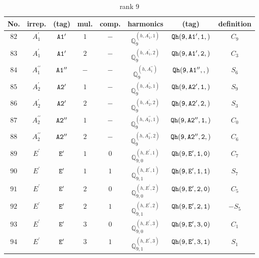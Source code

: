 \documentclass[fleqn,8pt]{jsarticle}
\begin{document}
\begin{table}[ht!]
\begin{center}
\caption{rank 9}
\renewcommand{\arraystretch}{1.3}
\begin{tabular}{cccccccc} \hline \hline
No. & irrep. & (tag) & mul. & comp. & harmonics & (tag) & definition \\ \hline
$ 82 $ & $ A_{1}^{\prime} $ & $ {\tt A1'} $ & $ 1 $ & $ - $ & $ \mathbb{Q}_{9}^{(h,A_{1}^{\prime},1)} $ & $ {\tt Qh(9,A1',1,)} $ & $ C_{9} $ \\
$ 83 $ & $ A_{1}^{\prime} $ & $ {\tt A1'} $ & $ 2 $ & $ - $ & $ \mathbb{Q}_{9}^{(h,A_{1}^{\prime},2)} $ & $ {\tt Qh(9,A1',2,)} $ & $ C_{3} $ \\
$ 84 $ & $ A_{1}^{\prime\prime} $ & $ {\tt A1''} $ & $ - $ & $ - $ & $ \mathbb{Q}_{9}^{(h,A_{1}^{\prime\prime})} $ & $ {\tt Qh(9,A1'',,)} $ & $ S_{6} $ \\
$ 85 $ & $ A_{2}^{\prime} $ & $ {\tt A2'} $ & $ 1 $ & $ - $ & $ \mathbb{Q}_{9}^{(h,A_{2}^{\prime},1)} $ & $ {\tt Qh(9,A2',1,)} $ & $ S_{9} $ \\
$ 86 $ & $ A_{2}^{\prime} $ & $ {\tt A2'} $ & $ 2 $ & $ - $ & $ \mathbb{Q}_{9}^{(h,A_{2}^{\prime},2)} $ & $ {\tt Qh(9,A2',2,)} $ & $ S_{3} $ \\
$ 87 $ & $ A_{2}^{\prime\prime} $ & $ {\tt A2''} $ & $ 1 $ & $ - $ & $ \mathbb{Q}_{9}^{(h,A_{2}^{\prime\prime},1)} $ & $ {\tt Qh(9,A2'',1,)} $ & $ C_{0} $ \\
$ 88 $ & $ A_{2}^{\prime\prime} $ & $ {\tt A2''} $ & $ 2 $ & $ - $ & $ \mathbb{Q}_{9}^{(h,A_{2}^{\prime\prime},2)} $ & $ {\tt Qh(9,A2'',2,)} $ & $ C_{6} $ \\
$ 89 $ & $ E^{\prime} $ & $ {\tt E'} $ & $ 1 $ & $ 0 $ & $ \mathbb{Q}_{9,0}^{(h,E^{\prime},1)} $ & $ {\tt Qh(9,E',1,0)} $ & $ C_{7} $ \\
$ 90 $ & $ E^{\prime} $ & $ {\tt E'} $ & $ 1 $ & $ 1 $ & $ \mathbb{Q}_{9,1}^{(h,E^{\prime},1)} $ & $ {\tt Qh(9,E',1,1)} $ & $ S_{7} $ \\
$ 91 $ & $ E^{\prime} $ & $ {\tt E'} $ & $ 2 $ & $ 0 $ & $ \mathbb{Q}_{9,0}^{(h,E^{\prime},2)} $ & $ {\tt Qh(9,E',2,0)} $ & $ C_{5} $ \\
$ 92 $ & $ E^{\prime} $ & $ {\tt E'} $ & $ 2 $ & $ 1 $ & $ \mathbb{Q}_{9,1}^{(h,E^{\prime},2)} $ & $ {\tt Qh(9,E',2,1)} $ & $ - S_{5} $ \\
$ 93 $ & $ E^{\prime} $ & $ {\tt E'} $ & $ 3 $ & $ 0 $ & $ \mathbb{Q}_{9,0}^{(h,E^{\prime},3)} $ & $ {\tt Qh(9,E',3,0)} $ & $ C_{1} $ \\
$ 94 $ & $ E^{\prime} $ & $ {\tt E'} $ & $ 3 $ & $ 1 $ & $ \mathbb{Q}_{9,1}^{(h,E^{\prime},3)} $ & $ {\tt Qh(9,E',3,1)} $ & $ S_{1} $ \\

\end{tabular}
\end{center}
\end{table}
\end{document}
